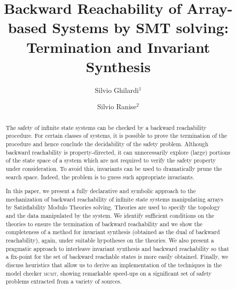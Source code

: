 \documentclass{LMCS}
\theoremstyle{plain}\newtheorem{assumption}[thm]{Assumption}
\theoremstyle{plain}\newtheorem{proposition}[thm]{Proposition}
\theoremstyle{plain}\newtheorem{property}[thm]{Property}
\theoremstyle{plain}\newtheorem{example}[thm]{Example}
\theoremstyle{plain}\newtheorem{claim}[thm]{Claim}
\theoremstyle{plain}\newtheorem{lemma}[thm]{Lemma}
\begin{document}
\title[Backward Reachability of Array-based Systems by SMT solving]{Backward Reachability of Array-based Systems by SMT solving:
  Termination and Invariant Synthesis}

\author[S.\ Ghilardi]{Silvio Ghilardi$^1$}	\address{$^1$Dipartimento di Scienze dell'Informazione, Universit\`a degli Studi di Milano (Italy)}	  

\author[S.\ Ranise]{Silvio Ranise$^2$}	\address{$^2$FBK-Irst, Trento (Italy)}	  







\begin{abstract}
  The safety of infinite state systems can be checked by a backward
  reachability procedure.  For certain classes of systems, it is
  possible to prove the termination of the procedure and hence
  conclude the decidability of the safety problem.  Although backward
  reachability is property-directed, it can unnecessarily explore
  (large) portions of the state space of a system which are not
  required to verify the safety property under consideration.  To
  avoid this, invariants can be used to dramatically prune the search
  space.  Indeed, the problem is to guess such appropriate invariants.

  In this paper, we present a fully declarative and symbolic approach
  to the mechanization of backward reachability of infinite state
  systems manipulating arrays by Satisfiability Modulo Theories
  solving.  Theories are used to specify the topology and the data
  manipulated by the system.  We identify sufficient conditions on the
  theories to ensure the termination of backward reachability and we
  show the completeness of a method for invariant synthesis (obtained
  as the dual of backward reachability), again, under suitable
  hypotheses on the theories.  We also present a pragmatic approach to
  interleave invariant synthesis and backward reachability so that a
  fix-point for the set of backward reachable states is more easily
  obtained.  Finally, we discuss heuristics that allow us to derive an
  implementation of the techniques in the model checker \textsc{mcmt},
  showing remarkable speed-ups on a significant set of safety problems
  extracted from a variety of sources.
\end{abstract}
\end{document}

